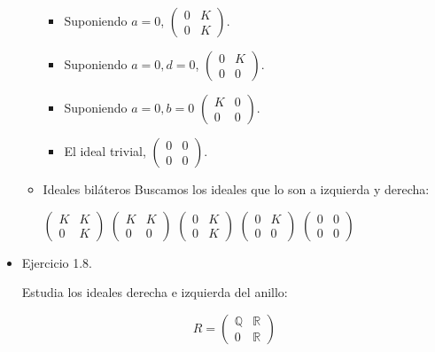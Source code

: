 \documentclass[11pt]{article}
\begin{document}
\begin{itemize}
\begin{itemize}
\begin{itemize}
\item Suponiendo $a=0$, $\begin{pmatrix}0 & K \\ 0 & K\end{pmatrix}$.

\item Suponiendo $a=0,d=0$, $\begin{pmatrix}0 & K \\ 0 & 0\end{pmatrix}$.

\item Suponiendo $a=0,b=0$ $\begin{pmatrix}K & 0 \\ 0 & 0\end{pmatrix}$.

\item El ideal trivial, $\begin{pmatrix}0 & 0 \\ 0 & 0\end{pmatrix}$.
\end{itemize}

\item Ideales biláteros
\label{sec-7-4-4-1-3}
Buscamos los ideales que lo son a izquierda y derecha:

$\begin{pmatrix}K & K \\ 0 & K\end{pmatrix}$ $\begin{pmatrix}K & K \\ 0 & 0\end{pmatrix}$ $\begin{pmatrix}0 & K \\ 0 & K\end{pmatrix}$ $\begin{pmatrix}0 & K \\ 0 & 0\end{pmatrix}$ $\begin{pmatrix}0 & 0 \\ 0 & 0\end{pmatrix}$
\end{itemize}

\item Ejercicio 1.8.
\label{sec-7-4-4-2}
\begin{statement}
Estudia los ideales derecha e izquierda del anillo:

\[
R = \begin{pmatrix}\mathbb{Q}&\mathbb{R}\\0&\mathbb{R}\end{pmatrix}
\]


\end{statement}
\end{itemize}
\end{document}
